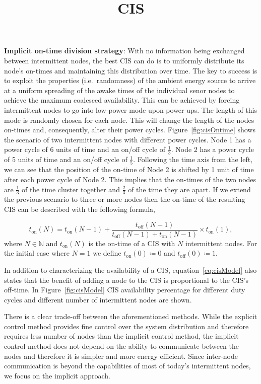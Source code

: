 \documentclass{article}
\title{CIS}
\newcommand{\sys}{CIS\xspace}
\begin{document}
\maketitle

\noindent\textbf{Implicit on-time division strategy}: 
With no information being exchanged between intermittent nodes, the best \sys can do is to uniformly distribute its node's on-times and maintaining this distribution over time. 
%
The key to success is to exploit the properties (i.e.\ randomness) of the ambient energy source to arrive at a uniform spreading of the awake times of the individual senor nodes to achieve the maximum coalesced availability. 
%
%
This can be achieved by forcing intermittent nodes to go into low-power mode upon power-ups. The length of this mode is randomly chosen for each node. This will change the length of the nodes on-times and, consequently, alter their power cycles. Figure~\ref{fig:cisOntime} shows the scenario of two intermittent nodes with different power cycles. Node 1 has a power cycle of 6 units of time and an on/off cycle of $\frac{1}{3}$. Node 2 has a power cycle of 5 units of time and an on/off cycle of $\frac{1}{5}$. Following the time axis from the left, we can see that the position of the on-time of Node 2 is shifted by 1 unit of time after each power cycle of Node 2. This implies that the on-times of the two nodes are $\frac{1}{3}$ of the time cluster together and $\frac{2}{3}$ of the time they are apart. If we extend the previous scenario to three or more nodes then the on-time of the resulting \sys can be described with the following formula,
				
\begin{equation}
	t_\text{on}(N) = t_\text{on}(N-1) + \frac{t_\text{off}(N-1)}{t_\text{off}(N-1)+t_\text{on}(N-1)} \times t_\text{on}(1),
		\label{eq:cisModel}
\end{equation}
where $N \in \mathbb{N}$ and  $t_\text{on}(N)$ is the on-time of a \sys with $N$ intermittent nodes. For the initial case where $N=1$ we define $t_\text{on}(0)\coloneqq 0$ and $t_\text{off}(0) \coloneqq 1$.
				
In addition to characterizing the availability of a \sys, equation~\ref{eq:cisModel} also states that the benefit of adding a node to the \sys is proportional to the \sys's off-time. In Figure~\ref{fig:cisModel} \sys availability percentage for different duty cycles and different number of intermittent nodes are shown.

There is a clear trade-off between the aforementioned methods. While the explicit control method provides fine control over the system 
distribution and therefore requires less number of nodes than the implicit control method, the implicit control method does not depend on the ability to communicate between the nodes and therefore it is simpler and more energy efficient. Since inter-node communication is beyond the capabilities of most of today's intermittent nodes, we focus on the implicit approach.
\end{document}
